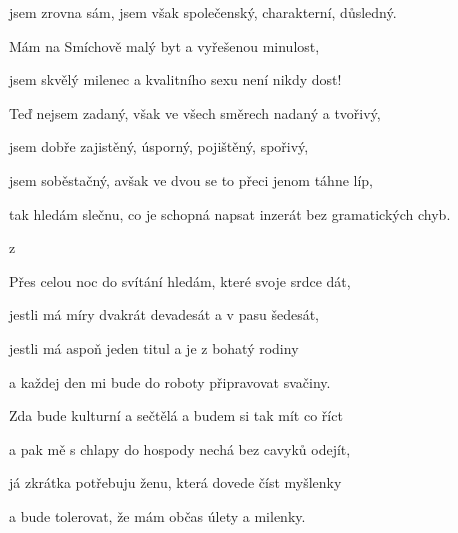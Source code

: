 

\zs
{}    

jsem zrovna sám, jsem však společenský, charakterní, důsledný.

Mám na Smíchově malý byt a vyřešenou minulost,

jsem skvělý milenec a kvalitního sexu není nikdy dost!
\ks

 
\zs
Teď nejsem zadaný, však ve všech směrech nadaný a tvořivý,

jsem dobře zajistěný, úsporný, pojištěný, spořivý,

jsem soběstačný, avšak ve dvou se to přeci jenom táhne líp,

tak hledám slečnu, co je schopná napsat inzerát bez gramatických chyb.
\ks
 
\zr
{}   

z    

   

  
\kr
 
\zs
Přes celou noc do svítání hledám, které svoje srdce dát,

jestli má míry dvakrát devadesát a v pasu šedesát,

jestli má aspoň jeden titul a je z bohatý rodiny

a každej den mi bude do roboty připravovat svačiny.
\ks
 
\zs
Zda bude kulturní a sečtělá a budem si tak mít co říct

a pak mě s chlapy do hospody nechá bez cavyků odejít,

já zkrátka potřebuju ženu, která dovede číst myšlenky

a bude tolerovat, že mám občas úlety a milenky.
\ks

\zr
\kr

\kp
